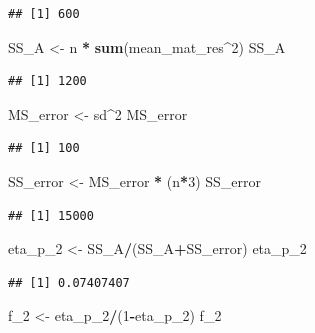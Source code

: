 \documentclass[]{book}
\newenvironment{Shaded}{\begin{snugshade}}{\end{snugshade}}
\newcommand{\DecValTok}[1]{\textcolor[rgb]{0.00,0.00,0.81}{#1}}
\newcommand{\KeywordTok}[1]{\textcolor[rgb]{0.13,0.29,0.53}{\textbf{#1}}}
\newcommand{\NormalTok}[1]{#1}
\newcommand{\OperatorTok}[1]{\textcolor[rgb]{0.81,0.36,0.00}{\textbf{#1}}}
\newcommand{\StringTok}[1]{\textcolor[rgb]{0.31,0.60,0.02}{#1}}
\begin{document}
\begin{verbatim}
## [1] 600
\end{verbatim}

\begin{Shaded}
\begin{Highlighting}[]
\NormalTok{SS_A <-}\StringTok{ }\NormalTok{n }\OperatorTok{*}\StringTok{ }\KeywordTok{sum}\NormalTok{(mean_mat_res}\OperatorTok{^}\DecValTok{2}\NormalTok{)}
\NormalTok{SS_A}
\end{Highlighting}
\end{Shaded}

\begin{verbatim}
## [1] 1200
\end{verbatim}

\begin{Shaded}
\begin{Highlighting}[]
\NormalTok{MS_error <-}\StringTok{ }\NormalTok{sd}\OperatorTok{^}\DecValTok{2}
\NormalTok{MS_error}
\end{Highlighting}
\end{Shaded}

\begin{verbatim}
## [1] 100
\end{verbatim}

\begin{Shaded}
\begin{Highlighting}[]
\NormalTok{SS_error <-}\StringTok{ }\NormalTok{MS_error }\OperatorTok{*}\StringTok{ }\NormalTok{(n}\OperatorTok{*}\DecValTok{3}\NormalTok{) }
\NormalTok{SS_error}
\end{Highlighting}
\end{Shaded}

\begin{verbatim}
## [1] 15000
\end{verbatim}

\begin{Shaded}
\begin{Highlighting}[]
\NormalTok{eta_p_}\DecValTok{2}\NormalTok{ <-}\StringTok{ }\NormalTok{SS_A}\OperatorTok{/}\NormalTok{(SS_A}\OperatorTok{+}\NormalTok{SS_error)}
\NormalTok{eta_p_}\DecValTok{2}
\end{Highlighting}
\end{Shaded}

\begin{verbatim}
## [1] 0.07407407
\end{verbatim}

\begin{Shaded}
\begin{Highlighting}[]
\NormalTok{f_}\DecValTok{2}\NormalTok{ <-}\StringTok{ }\NormalTok{eta_p_}\DecValTok{2}\OperatorTok{/}\NormalTok{(}\DecValTok{1}\OperatorTok{-}\NormalTok{eta_p_}\DecValTok{2}\NormalTok{)}
\NormalTok{f_}\DecValTok{2}
\end{Highlighting}
\end{Shaded}
\end{document}
